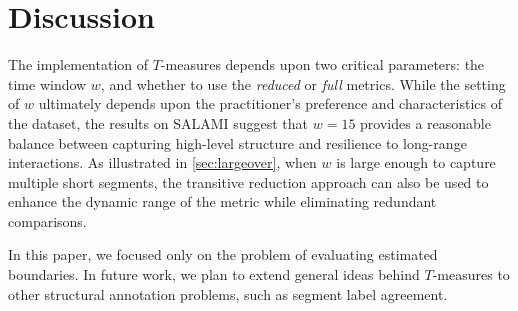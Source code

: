 \documentclass{article}
\begin{document}


\section{Discussion}\label{sec:conclusions}

The implementation of $T$-measures depends upon two critical parameters: the time window
$w$, and whether to use the \emph{reduced} or \emph{full} metrics.  While the setting of
$w$ ultimately depends upon the practitioner's preference and characteristics of the
dataset, the results on SALAMI suggest that $w=15$ provides a reasonable balance
between capturing high-level structure and resilience to long-range interactions.
As illustrated in \cref{sec:largeover}, when $w$ is large enough to capture multiple short
segments, the transitive reduction approach can also be used to enhance the dynamic range
of the metric while eliminating redundant comparisons.

In this paper, we focused only on the problem of evaluating estimated boundaries.
In future work, we plan to extend general ideas behind $T$-measures to other structural 
annotation problems, such as segment label agreement.


\end{document}
